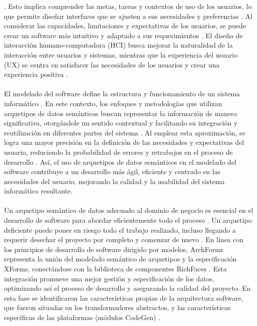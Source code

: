 \documentclass[12pt,a4paper]{article}
\begin{document}
\cite{Barbieri2013}
\cite{Martins1990}
\cite{Kopanitsa2015}
. Esto implica comprender las metas, tareas y contextos de uso de los usuarios, lo que permite diseñar interfaces que se ajusten a sus necesidades y preferencias
\cite{Gadea2016}
\cite{Pozdniakova2017}
. Al considerar las capacidades, limitaciones y expectativas de los usuarios, se puede crear un software más intuitivo y adaptado a sus requerimientos
\cite{Kopanitsa2015}
\cite{Hassan2017}
. El diseño de interacción humano-computadora (HCI) busca mejorar la naturalidad de la interacción entre usuarios y sistemas, mientras que la experiencia del usuario (UX) se centra en satisfacer las necesidades de los usuarios y crear una experiencia positiva
\cite{Qanbari2016}
\cite{Feras2022}
. 
\\\\
El modelado del software define la estructura y funcionamiento de un sistema informático
\cite{Hassan2016}
\cite{Gadea2016}
. En este contexto, los enfoques y metodologías que utilizan arquetipos de datos semánticos buscan representar la información de manera significativa, otorgándole un sentido contextual y facilitando su integración y reutilización en diferentes partes del sistema
\cite{Ward1987}
\cite{Duftschmid2010}
. Al emplear esta aproximación, se logra una mayor precisión en la definición de las necesidades y expectativas del usuario, reduciendo la probabilidad de errores y retrabajos en el proceso de desarrollo
\cite{Allones2013}
\cite{Morup2012}
. Así, el uso de arquetipos de datos semánticos en el modelado del software contribuye a un desarrollo más ágil, eficiente y centrado en las necesidades del usuario, mejorando la calidad y la usabilidad del sistema informático resultante.
\\\\
Un arquetipo semántico de datos adecuado al dominio de negocio es esencial en el desarrollo de software para abordar eficientemente todo el proceso
\cite{Govinda2015}
\cite{Gouvas2016}
. Un arquetipo deficiente puede poner en riesgo todo el trabajo realizado, incluso llegando a requerir desechar el proyecto por completo y comenzar de nuevo
\cite{Duftschmid2010}
\cite{Cosenz2017}
. En línea con los principios de desarrollo de software dirigido por modelos, ArchForms representa la unión del modelado semántico de arquetipos y la especificación XForms, conectándose con la biblioteca de componentes RichFaces
\cite{Guo2015}
\cite{Batini1992}
. Esta integración promueve una mejor gestión y especificación de los datos, optimizando así el proceso de desarrollo y asegurando la calidad del proyecto. En esta fase se identificaron las características propias de la arquitectura software, que fueron situadas en los transformadores abstractos, y las características específicas de las plataformas (módulos CodeGen)
\cite{Stacey2017}
\cite{Upadhyay2023}
. 
\end{document}
